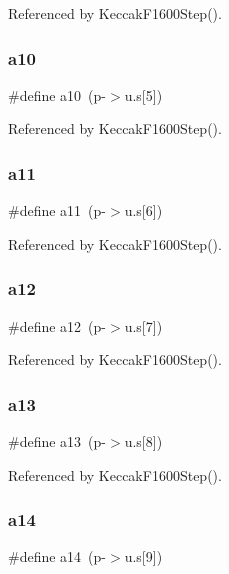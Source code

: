 Referenced by Keccak\+F1600\+Step().

\mbox{\label{shell_8c_aa0f92f1b1fcdd533d92ea37635751740}} 
\subsubsection{a10}
{\footnotesize\ttfamily \#define a10~(p-\/$>$u.\+s[5])}



Referenced by Keccak\+F1600\+Step().

\mbox{\label{shell_8c_a9d60b7555bdcb35190e37574b7b11a99}} 
\subsubsection{a11}
{\footnotesize\ttfamily \#define a11~(p-\/$>$u.\+s[6])}



Referenced by Keccak\+F1600\+Step().

\mbox{\label{shell_8c_a7c8af197e94c319046aa42aa57d9236c}} 
\subsubsection{a12}
{\footnotesize\ttfamily \#define a12~(p-\/$>$u.\+s[7])}



Referenced by Keccak\+F1600\+Step().

\mbox{\label{shell_8c_a809bbb184ed5e17540c48e924418d287}} 
\subsubsection{a13}
{\footnotesize\ttfamily \#define a13~(p-\/$>$u.\+s[8])}



Referenced by Keccak\+F1600\+Step().

\mbox{\label{shell_8c_a30e0a1609004241e2bab87e975a0a96f}} 
\subsubsection{a14}
{\footnotesize\ttfamily \#define a14~(p-\/$>$u.\+s[9])}



